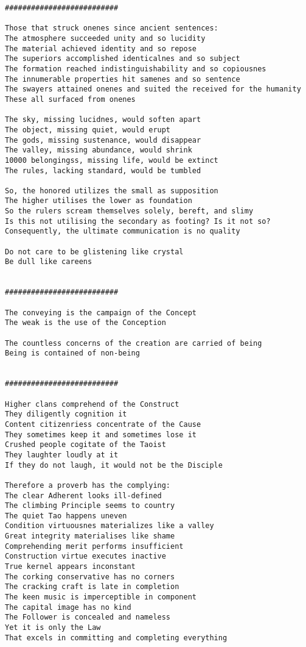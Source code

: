 \documentclass[12pt,a4paper,oneside]{book}
\begin{document}
\begin{verbatim}
##########################

Those that struck onenes since ancient sentences:
The atmosphere succeeded unity and so lucidity
The material achieved identity and so repose
The superiors accomplished identicalnes and so subject
The formation reached indistinguishability and so copiousnes
The innumerable properties hit samenes and so sentence
The swayers attained onenes and suited the received for the humanity
These all surfaced from onenes

The sky, missing lucidnes, would soften apart
The object, missing quiet, would erupt
The gods, missing sustenance, would disappear
The valley, missing abundance, would shrink
10000 belongingss, missing life, would be extinct
The rules, lacking standard, would be tumbled

So, the honored utilizes the small as supposition
The higher utilises the lower as foundation
So the rulers scream themselves solely, bereft, and slimy
Is this not utilising the secondary as footing? Is it not so? Consequently, the ultimate communication is no quality

Do not care to be glistening like crystal
Be dull like careens


##########################

The conveying is the campaign of the Concept
The weak is the use of the Conception

The countless concerns of the creation are carried of being
Being is contained of non-being


##########################

Higher clans comprehend of the Construct
They diligently cognition it
Content citizenriess concentrate of the Cause
They sometimes keep it and sometimes lose it
Crushed people cogitate of the Taoist
They laughter loudly at it
If they do not laugh, it would not be the Disciple

Therefore a proverb has the complying:
The clear Adherent looks ill-defined
The climbing Principle seems to country
The quiet Tao happens uneven
Condition virtuousnes materializes like a valley
Great integrity materialises like shame
Comprehending merit performs insufficient
Construction virtue executes inactive
True kernel appears inconstant
The corking conservative has no corners
The cracking craft is late in completion
The keen music is imperceptible in component
The capital image has no kind
The Follower is concealed and nameless
Yet it is only the Law
That excels in committing and completing everything



\end{verbatim}
\end{document}
